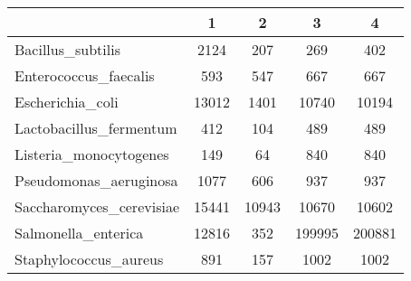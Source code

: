\begin{tabular}{|l||c|c|c|c|}
\hline
& 1 & 2 & 3 & 4 \\
\hline
\hline
Bacillus\_subtilis & \cellcolor[RGB]{235, 71, 71} 2124 & \cellcolor[RGB]{227, 227, 252} 207 & \cellcolor[RGB]{241, 241, 253} 269 & \cellcolor[RGB]{253, 237, 237} 402 \\
\hline
Enterococcus\_faecalis & \cellcolor[RGB]{241, 241, 253} 593 & \cellcolor[RGB]{227, 227, 252} 547 & \cellcolor[RGB]{253, 241, 241} 667 & \cellcolor[RGB]{253, 241, 241} 667 \\
\hline
Escherichia\_coli & \cellcolor[RGB]{253, 237, 237} 13012 & \cellcolor[RGB]{218, 218, 251} 1401 & \cellcolor[RGB]{255, 255, 255} 10740 & \cellcolor[RGB]{255, 255, 255} 10194 \\
\hline
Lactobacillus\_fermentum & \cellcolor[RGB]{250, 250, 254} 412 & \cellcolor[RGB]{223, 223, 251} 104 & \cellcolor[RGB]{254, 250, 250} 489 & \cellcolor[RGB]{254, 250, 250} 489 \\
\hline
Listeria\_monocytogenes & \cellcolor[RGB]{237, 237, 253} 149 & \cellcolor[RGB]{232, 232, 252} 64 & \cellcolor[RGB]{252, 232, 232} 840 & \cellcolor[RGB]{252, 232, 232} 840 \\
\hline
Pseudomonas\_aeruginosa & \cellcolor[RGB]{252, 227, 227} 1077 & \cellcolor[RGB]{218, 218, 251} 606 & \cellcolor[RGB]{255, 255, 255} 937 & \cellcolor[RGB]{255, 255, 255} 937 \\
\hline
Saccharomyces\_cerevisiae & \cellcolor[RGB]{235, 71, 71} 15441 & \cellcolor[RGB]{253, 237, 237} 10943 & \cellcolor[RGB]{237, 237, 253} 10670 & \cellcolor[RGB]{227, 227, 252} 10602 \\
\hline
Salmonella\_enterica & \cellcolor[RGB]{232, 232, 252} 12816 & \cellcolor[RGB]{232, 232, 252} 352 & \cellcolor[RGB]{252, 232, 232} 199995 & \cellcolor[RGB]{252, 232, 232} 200881 \\
\hline
Staphylococcus\_aureus & \cellcolor[RGB]{250, 250, 254} 891 & \cellcolor[RGB]{218, 218, 251} 157 & \cellcolor[RGB]{254, 250, 250} 1002 & \cellcolor[RGB]{254, 250, 250} 1002 \\
\hline
\end{tabular}
